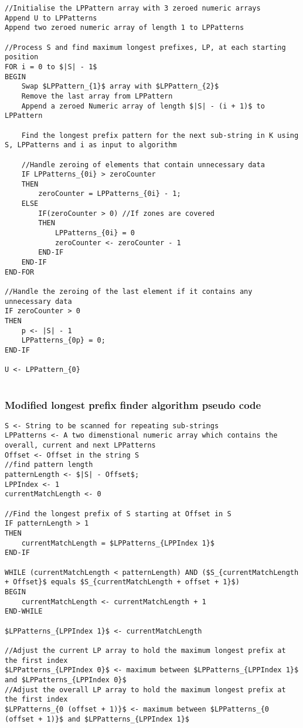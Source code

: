 \documentclass[12pt]{article}
\begin{document}
\begin{flushleft}
\begin{lstlisting}
//Initialise the LPPattern array with 3 zeroed numeric arrays
Append U to LPPatterns 
Append two zeroed numeric array of length 1 to LPPatterns

//Process S and find maximum longest prefixes, LP, at each starting position
FOR i = 0 to $|S| - 1$
BEGIN
    Swap $LPPattern_{1}$ array with $LPPattern_{2}$
	Remove the last array from LPPattern    
    Append a zeroed Numeric array of length $|S| - (i + 1)$ to LPPattern

	Find the longest prefix pattern for the next sub-string in K using S, LPPatterns and i as input to algorithm

    //Handle zeroing of elements that contain unnecessary data
	IF LPPatterns_{0i} > zeroCounter 
	THEN
		zeroCounter = LPPatterns_{0i} - 1;
	ELSE 
		IF(zeroCounter > 0) //If zones are covered
		THEN
 			LPPatterns_{0i} = 0
 			zeroCounter <- zeroCounter - 1
 		END-IF                   
	END-IF
END-FOR

//Handle the zeroing of the last element if it contains any unnecessary data
IF zeroCounter > 0
THEN
	p <- |S| - 1
	LPPatterns_{0p} = 0;
END-IF

U <- LPPattern_{0}


\end{lstlisting}

\newpage
\subsubsection{Modified longest prefix finder algorithm pseudo code}

\begin{lstlisting}
S <- String to be scanned for repeating sub-strings
LPPatterns <- A two dimenstional numeric array which contains the overall, current and next LPPatterns 
Offset <- Offset in the string S
//find pattern length
patternLength <- $|S| - Offset$;
LPPIndex <- 1 
currentMatchLength <- 0

//Find the longest prefix of S starting at Offset in S
IF patternLength > 1 
THEN
	currentMatchLength = $LPPatterns_{LPPIndex 1}$
END-IF

WHILE (currentMatchLength < patternLength) AND ($S_{currentMatchLength + Offset}$ equals $S_{currentMatchLength + offset + 1}$)
BEGIN
	currentMatchLength <- currentMatchLength + 1
END-WHILE

$LPPatterns_{LPPIndex 1}$ <- currentMatchLength

//Adjust the current LP array to hold the maximum longest prefix at the first index
$LPPatterns_{LPPIndex 0}$ <- maximum between $LPPatterns_{LPPIndex 1}$ and $LPPatterns_{LPPIndex 0}$
//Adjust the overall LP array to hold the maximum longest prefix at the first index
$LPPatterns_{0 (offset + 1)}$ <- maximum between $LPPatterns_{0 (offset + 1)}$ and $LPPatterns_{LPPIndex 1}$


\end{lstlisting}
\end{flushleft}
\end{document}
